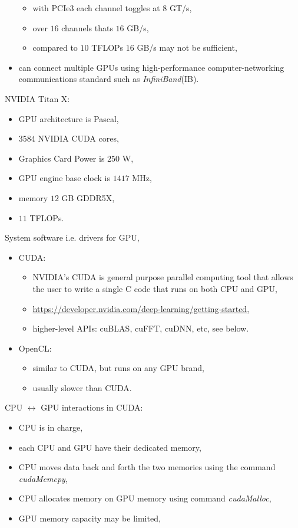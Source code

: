 \documentclass[onecolumn]{IEEEtran}
\newcommand{\bi}{\begin{itemize}}
\newcommand{\ei}{\end{itemize}}
\begin{document}
\begin{itemize}
        \bi
            \item with PCIe3 each channel toggles at $8$ GT/s,
            \item over $16$ channels thats $16$ GB/s,
            \item compared to $10$ TFLOPs  $16$ GB/s may not be sufficient,
        \ei
        \item can connect multiple GPUs using  high-performance computer-networking communications standard such as \emph{InfiniBand}(IB).
    \ei
    \item NVIDIA Titan X:
    \bi
        \item GPU architecture is Pascal,
        \item $3584$ NVIDIA CUDA cores,
        \item Graphics Card Power is $250$ W,
        \item GPU engine base clock is $1417$ MHz,
        \item memory $12$ GB GDDR5X,
        \item $11$ TFLOPs.
    \ei
    \item System software i.e. drivers for GPU,
    \bi
        \item CUDA:
        \bi
            \item NVIDIA's CUDA is general purpose parallel computing tool that allows the user to write a single C code that runs on both CPU and GPU,
            \item \url{https://developer.nvidia.com/deep-learning/getting-started},
            \item higher-level APIs: cuBLAS, cuFFT, cuDNN, etc, see below.
        \ei
        \item OpenCL:
        \bi
            \item similar to CUDA, but runs on any GPU brand,
            \item usually slower than CUDA.
        \ei
    \ei
    \item CPU $\leftrightarrow$ GPU interactions in CUDA:
    \bi
        \item CPU is in charge,
        \item each CPU and GPU have their dedicated memory,
        \item CPU moves data back and forth the two memories using the command \emph{cudaMemcpy},
        \item CPU allocates memory on GPU memory using command \emph{cudaMalloc},
        \item GPU memory capacity may be limited,

\end{itemize}
\end{document}
